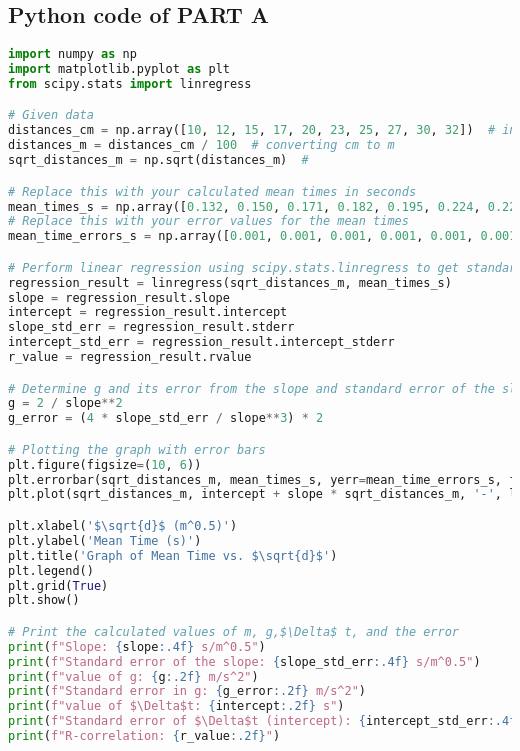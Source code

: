 \documentclass[a4paper,11pt]{article}
\begin{document}
\subsection*{Python code of PART A}
\begin{lstlisting}[language=Python]
import numpy as np
import matplotlib.pyplot as plt
from scipy.stats import linregress

# Given data
distances_cm = np.array([10, 12, 15, 17, 20, 23, 25, 27, 30, 32])  # in cm
distances_m = distances_cm / 100  # converting cm to m
sqrt_distances_m = np.sqrt(distances_m)  # 

# Replace this with your calculated mean times in seconds
mean_times_s = np.array([0.132, 0.150, 0.171, 0.182, 0.195, 0.224, 0.222, 0.231, 0.242, 0.249])
# Replace this with your error values for the mean times
mean_time_errors_s = np.array([0.001, 0.001, 0.001, 0.001, 0.001, 0.001, 0.001, 0.001, 0.001, 0.001])

# Perform linear regression using scipy.stats.linregress to get standard error of the slope
regression_result = linregress(sqrt_distances_m, mean_times_s)
slope = regression_result.slope
intercept = regression_result.intercept
slope_std_err = regression_result.stderr
intercept_std_err = regression_result.intercept_stderr
r_value = regression_result.rvalue

# Determine g and its error from the slope and standard error of the slope
g = 2 / slope**2
g_error = (4 * slope_std_err / slope**3) * 2

# Plotting the graph with error bars
plt.figure(figsize=(10, 6))
plt.errorbar(sqrt_distances_m, mean_times_s, yerr=mean_time_errors_s, fmt='o', label='Experimental Data', capsize=5)
plt.plot(sqrt_distances_m, intercept + slope * sqrt_distances_m, '-', label=f'Linear Fit: $\\bar{{t}} = {slope:.2f}\\sqrt{{d}} + {intercept:.2f}$')

plt.xlabel('$\sqrt{d}$ (m^0.5)')
plt.ylabel('Mean Time (s)')
plt.title('Graph of Mean Time vs. $\sqrt{d}$')
plt.legend()
plt.grid(True)
plt.show()

# Print the calculated values of m, g,$\Delta$ t, and the error
print(f"Slope: {slope:.4f} s/m^0.5")
print(f"Standard error of the slope: {slope_std_err:.4f} s/m^0.5")
print(f"value of g: {g:.2f} m/s^2")
print(f"Standard error in g: {g_error:.2f} m/s^2")
print(f"value of $\Delta$t: {intercept:.2f} s")
print(f"Standard error of $\Delta$t (intercept): {intercept_std_err:.4f} s")
print(f"R-correlation: {r_value:.2f}")
\end{lstlisting}
\end{document}
